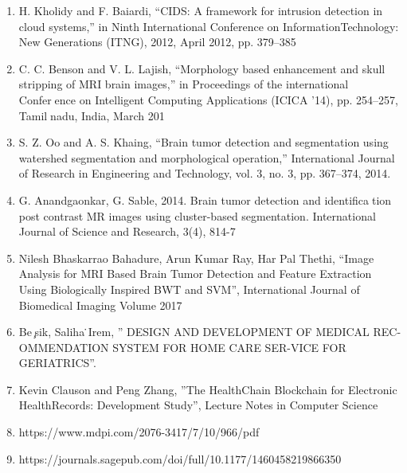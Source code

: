 \documentclass[oneside,a4paper,12pt]{book}
\begin{document}
\setlength{\parskip}{0.0pt}
\begin{enumerate}
    \item H. Kholidy and F. Baiardi, “CIDS: A framework for intrusion detection in
cloud systems,” in Ninth International Conference on InformationTechnology:
New Generations (ITNG), 2012, April 2012, pp. 379–385 \par
 \item C. C. Benson and V. L. Lajish, “Morphology based enhancement and skull
stripping of MRI brain images,” in Proceedings of the international Conference on Intelligent Computing Applications (ICICA ’14), pp. 254–257, Tamilnadu, India, March 201\par

 \item S. Z. Oo and A. S. Khaing, “Brain tumor detection and segmentation using
watershed segmentation and morphological operation,” International Journal
of Research in Engineering and Technology, vol. 3, no. 3, pp. 367–374, 2014.\par

 \item G. Anandgaonkar, G. Sable, 2014. Brain tumor detection and identification post contrast MR images using cluster-based segmentation. International
Journal of Science and Research, 3(4), 814-7 \par
    
    \item Nilesh Bhaskarrao Bahadure, Arun Kumar Ray, Har Pal Thethi, “Image
Analysis for MRI Based Brain Tumor Detection and Feature Extraction Using
Biologically Inspired BWT and SVM”, International Journal of Biomedical
Imaging Volume 2017\par

	\item Be ̧sik, Saliha  ̇Irem, ” DESIGN AND DEVELOPMENT OF MEDICAL REC-OMMENDATION SYSTEM FOR HOME CARE SER-VICE FOR GERIATRICS”.\par

	\item Kevin Clauson and Peng Zhang, ”The  HealthChain  Blockchain  for  Electronic  HealthRecords: Development Study”, Lecture Notes in Computer Science\par

	\item https://www.mdpi.com/2076-3417/7/10/966/pdf
\par

	\item  https://journals.sagepub.com/doi/full/10.1177/1460458219866350
\par
        

\end{enumerate}
\end{document}
